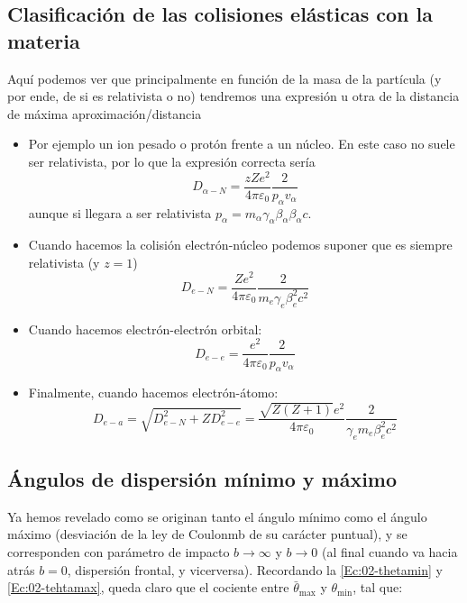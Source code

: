 \subsection{Clasificación de las colisiones elásticas con la materia}

Aquí podemos ver que principalmente en función de la masa de la partícula (y por ende, de si es relativista o no) tendremos una expresión u otra de la distancia de máxima aproximación/distancia 

\begin{itemize}
    \item Por ejemplo un ion pesado o protón frente a un núcleo. En este caso no suele ser relativista, por lo que la expresión correcta sería
    \begin{equation}
            D_{\alpha-N} = \frac{zZe^2}{4\pi \varepsilon_0} \frac{2}{p_\alpha v_\alpha }
    \end{equation}
    aunque si llegara a ser relativista $p_{\alpha} = m_{\alpha} \gamma_{\alpha} \beta_{\alpha} \beta_{\alpha} c$. 
    \item Cuando hacemos la colisión electrón-núcleo podemos suponer que es siempre relativista (y $z=1$)
    \begin{equation}
            D_{e-N} = \frac{Ze^2}{4\pi \varepsilon_0} \frac{2}{ m_{e} \gamma_{e} \beta_{e}^2 c^2 }
    \end{equation}
    \item Cuando hacemos electrón-electrón orbital: 
    \begin{equation}
            D_{e-e} = \frac{e^2}{4\pi \varepsilon_0} \frac{2}{p_\alpha v_\alpha }
    \end{equation}
    \item Finalmente, cuando hacemos electrón-átomo: 
    \begin{equation}
            D_{e-a} = \sqrt{D_{e-N}^2+ZD_{e-e}^2} = \frac{\sqrt{Z(Z+1)}e^2}{4\pi \varepsilon_0} \frac{2}{\gamma_e m_e \beta^2_e c^2 }
    \end{equation}
\end{itemize}

\subsection{Ángulos de dispersión mínimo y máximo}

Ya hemos revelado como se originan tanto el ángulo mínimo como el ángulo máximo (desviación de la ley de Coulonmb de su carácter puntual), y se corresponden con parámetro de impacto $b \to \infty$ y $b \to 0$ (al final cuando va hacia atrás $b=0$, dispersión frontal, y vicerversa). Recordando la \cref{Ec:02-thetamin} y \cref{Ec:02-tehtamax}, queda claro que el cociente entre $\bar{\theta}_{\max}$ y $\theta_{\min}$, tal que: 


